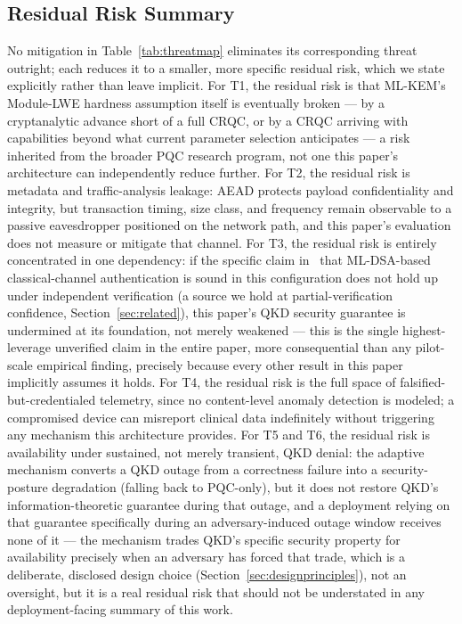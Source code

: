 \documentclass[journal]{IEEEtran}
\begin{document}
\subsection{Residual Risk Summary}

No mitigation in Table~\ref{tab:threatmap} eliminates its corresponding threat outright; each reduces it to a smaller, more specific residual risk, which we state explicitly rather than leave implicit. For T1, the residual risk is that ML-KEM's Module-LWE hardness assumption itself is eventually broken --- by a cryptanalytic advance short of a full CRQC, or by a CRQC arriving with capabilities beyond what current parameter selection anticipates --- a risk inherited from the broader PQC research program, not one this paper's architecture can independently reduce further. For T2, the residual risk is metadata and traffic-analysis leakage: AEAD protects payload confidentiality and integrity, but transaction timing, size class, and frequency remain observable to a passive eavesdropper positioned on the network path, and this paper's evaluation does not measure or mitigate that channel. For T3, the residual risk is entirely concentrated in one dependency: if the specific claim in~\cite{atutxasanz2025authentication} that ML-DSA-based classical-channel authentication is sound in this configuration does not hold up under independent verification (a source we hold at partial-verification confidence, Section~\ref{sec:related}), this paper's QKD security guarantee is undermined at its foundation, not merely weakened --- this is the single highest-leverage unverified claim in the entire paper, more consequential than any pilot-scale empirical finding, precisely because every other result in this paper implicitly assumes it holds. For T4, the residual risk is the full space of falsified-but-credentialed telemetry, since no content-level anomaly detection is modeled; a compromised device can misreport clinical data indefinitely without triggering any mechanism this architecture provides. For T5 and T6, the residual risk is availability under sustained, not merely transient, QKD denial: the adaptive mechanism converts a QKD outage from a correctness failure into a security-posture degradation (falling back to PQC-only), but it does not restore QKD's information-theoretic guarantee during that outage, and a deployment relying on that guarantee specifically during an adversary-induced outage window receives none of it --- the mechanism trades QKD's specific security property for availability precisely when an adversary has forced that trade, which is a deliberate, disclosed design choice (Section~\ref{sec:designprinciples}), not an oversight, but it is a real residual risk that should not be understated in any deployment-facing summary of this work.
\end{document}

